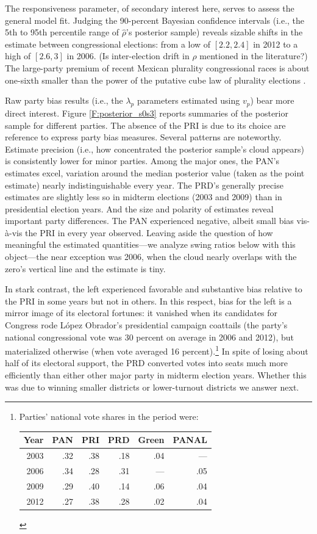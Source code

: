 \documentclass[letter,12pt]{article}
\begin{document}
The responsiveness parameter, of secondary interest here, serves to assess the general model fit. Judging the 90-percent Bayesian confidence intervals (i.e., the 5th to 95th percentile range of $\hat{\rho}$'s posterior sample) reveals sizable shifts in the estimate between congressional elections: from a low of $[2.2,2.4]$ in 2012 to a high of $[2.6,3]$ in 2006. (Is inter-election drift in $\rho$ mentioned in the literature?) The large-party premium of recent Mexican plurality congressional races is about one-sixth smaller than the power of the putative cube law of plurality elections \citep{taagepera.CubeLaw.1973}. 

Raw party bias results (i.e., the $\lambda_p$ parameters estimated using $v_p$) bear more direct interest. Figure \ref{F:posterior_s0s3} reports summaries of the posterior sample for different parties. The absence of the PRI is due to its choice are reference to express party bias measures. Several patterns are noteworthy. Estimate precision (i.e., how concentrated the posterior sample's cloud appears) is consistently lower for minor parties. Among the major ones, the PAN's estimates excel, variation around the median posterior value (taken as the point estimate) nearly indistinguishable every year. The PRD's generally precise estimates are slightly less so in midterm elections (2003 and 2009) than in presidential election years. And the size and polarity of estimates reveal important party differences. The PAN experienced negative, albeit small bias vis-\`a-vis the PRI in every year observed. Leaving aside the question of how meaningful the estimated quantities---we analyze swing ratios below with this object---the near exception was 2006, when the cloud nearly overlaps with the zero's vertical line and the estimate is tiny. 

In stark contrast, the left experienced favorable and substantive bias relative to the PRI in some years but not in others. In this respect, bias for the left is a mirror image of its electoral fortunes: it vanished when its candidates for Congress rode L\'opez Obrador's presidential campaign coattails (the party's national congressional vote was 30 percent on average in 2006 and 2012), but materialized otherwise (when vote averaged 16 percent).\footnote{Parties' national vote shares in the period were: \begin{tabular}{rrrrrr} Year & PAN & PRI & PRD & Green & PANAL \\ \hline 2003 & .32 & .38 & .18 & .04 & --- \\ 2006 & .34 & .28 & .31 & --- & .05 \\ 2009 & .29 & .40 & .14 & .06 & .04 \\ 2012 & .27 & .38 & .28 & .02 & .04 \\ \end{tabular}} In spite of losing about half of its electoral support, the PRD converted votes into seats much more efficiently than either other major party in midterm election years. Whether this was due to winning smaller districts or lower-turnout districts we answer next.
\end{document}
